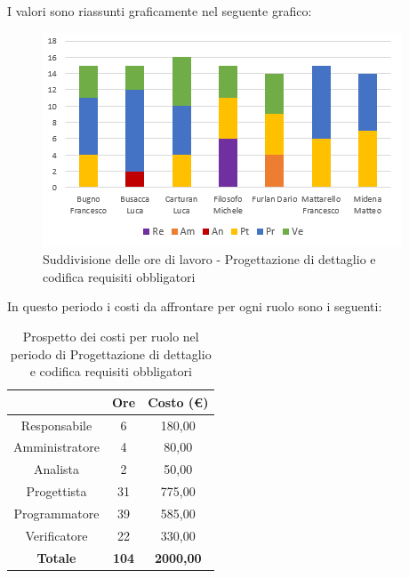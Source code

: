 I valori sono riassunti graficamente nel seguente grafico:

\begin{figure}[H]
  \centering
  \includegraphics[scale=1.2]{immagini/ore_lavoro_reqObbligatori.png}
  \caption{Suddivisione delle ore di lavoro - Progettazione di dettaglio e codifica requisiti obbligatori}
\end{figure}

\pagebreak
In questo periodo i costi da affrontare per ogni ruolo sono i seguenti:

\begin{table}[H]
  \centering
  \renewcommand{\arraystretch}{1.8}
  \begin{tabular}{c|c|c}
    \rowcolor[HTML]{125E28}
    \multicolumn{1}{c}{\color[HTML]{FFFFFF}\textbf{Ruolo}}
                    & \multicolumn{1}{c}{\color[HTML]{FFFFFF}\textbf{Ore}}
                    & \multicolumn{1}{c}{\color[HTML]{FFFFFF}\textbf{Costo (€)}}                    \\
    \hline
    Responsabile    & 6                                                          & 180,00           \\
    Amministratore  & 4                                                          & 80,00            \\
    Analista        & 2                                                          & 50,00            \\
    Progettista     & 31                                                         & 775,00           \\
    Programmatore   & 39                                                         & 585,00           \\
    Verificatore    & 22                                                         & 330,00           \\
    \textbf{Totale} & \textbf{104}                                               & \textbf{2000,00}
  \end{tabular}
  \caption{Prospetto dei costi per ruolo nel periodo di Progettazione di dettaglio e codifica requisiti obbligatori}
\end{table}

